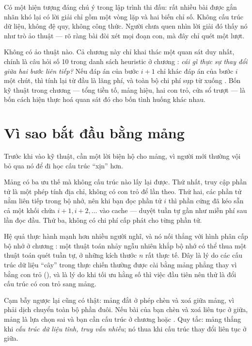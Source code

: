 \documentclass[../../algorithm.tex]{subfiles}
\begin{document}
Có một hiện tượng đáng chú ý trong lập trình thi đấu: rất nhiều bài được gắn nhãn khó lại có lời giải chỉ gồm một vòng lặp và hai biến chỉ số. Không cấu trúc dữ liệu, không đệ quy, không công thức. Người chưa quen nhìn lời giải đó thấy nó như trò ảo thuật --- rõ ràng bài đòi xét mọi đoạn con, mà đây chỉ quét một lượt.

Không có ảo thuật nào. Cả chương này chỉ khai thác một quan sát duy nhất, chính là câu hỏi số 10 trong danh sách heuristic ở chương : \emph{cái gì thực sự thay đổi giữa hai bước liên tiếp?} Nếu đáp án của bước \(i+1\) chỉ khác đáp án của bước \(i\) một chút, thì tính lại từ đầu là lãng phí, và toàn bộ chi phí sụp từ  xuống . Bốn kỹ thuật trong chương --- tổng tiền tố, mảng hiệu, hai con trỏ, cửa sổ trượt --- là bốn cách hiện thực hoá quan sát đó cho bốn tình huống khác nhau.

\section{Vì sao bắt đầu bằng mảng}

Trước khi vào kỹ thuật, cần một lời biện hộ cho mảng, vì người mới thường vội bỏ qua nó để đi học cấu trúc ``xịn'' hơn.

Mảng có ba ưu thế mà không cấu trúc nào lấy lại được. Thứ nhất, truy cập phần tử là một phép tính địa chỉ, không có con trỏ để lần theo. Thứ hai, các phần tử nằm liên tiếp trong bộ nhớ, nên khi bạn đọc phần tử \(i\) thì phần cứng đã kéo sẵn cả một khối chứa \(i+1, i+2, \dots\) vào cache --- duyệt tuần tự gần như miễn phí sau lần đọc đầu. Thứ ba, không có chi phí cấp phát cho từng phần tử.

Hệ quả thực hành mạnh hơn nhiều người nghĩ, và nó nối thẳng với hình phân cấp bộ nhớ ở chương : một thuật toán  nhảy ngẫu nhiên khắp bộ nhớ có thể thua một thuật toán  quét tuần tự, ở những kích thước \(n\) rất thực tế. Đây là lý do các cấu trúc dữ liệu ``cây'' trong thực chiến thường được cài bằng mảng phẳng thay vì bằng con trỏ (), và là lý do khi tối ưu hằng số thì việc đầu tiên nên thử là đổi cấu trúc có con trỏ sang mảng.

\begin{cambay}
Cạm bẫy ngược lại cũng có thật: mảng đắt ở phép chèn và xoá giữa mảng, vì phải dịch chuyển toàn bộ phần đuôi. Nếu bài của bạn chèn và xoá liên tục ở giữa, mảng là lựa chọn sai và bạn cần cấu trúc ở chương  hoặc . Quy tắc: mảng thắng khi \emph{cấu trúc dữ liệu tĩnh, truy vấn nhiều}; nó thua khi cấu trúc thay đổi liên tục ở giữa.
\end{cambay}
\end{document}
